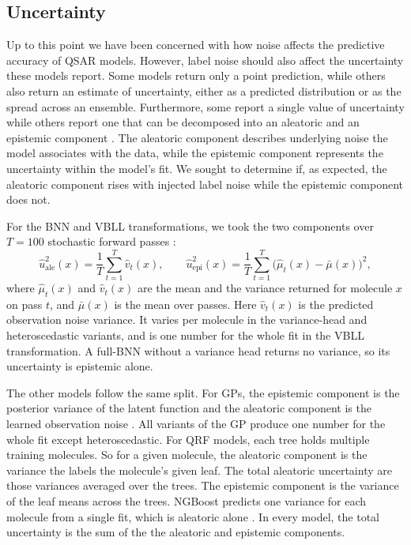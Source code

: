 \subsection{Uncertainty}

Up to this point we have been concerned with how noise affects the predictive accuracy of QSAR models. However, label noise should also affect the uncertainty these models report. Some models return only a point prediction, while others also return an estimate of uncertainty, either as a predicted distribution or as the spread across an ensemble. Furthermore, some report a single value of uncertainty while others report one that can be decomposed into an aleatoric and an epistemic component \citep{kendall2017}. The aleatoric component describes underlying noise the model associates with the data, while the epistemic component represents the uncertainty within the model's fit. We sought to determine if, as expected, the aleatoric component rises with injected label noise while the epistemic component does not.

For the BNN and VBLL transformations, we took the two components over $T = 100$ stochastic forward
passes \citep{kendall2017}:
\begin{equation}
\hat{u}^2_{\text{ale}}(x) = \frac{1}{T}\sum_{t=1}^{T}\hat{v}_t(x),
\qquad
\hat{u}^2_{\text{epi}}(x) = \frac{1}{T}\sum_{t=1}^{T}\big(\hat{\mu}_t(x) - \bar{\mu}(x)\big)^2 ,
\label{eq:sampling_split}
\end{equation}
where $\hat{\mu}_t(x)$ and $\hat{v}_t(x)$ are the mean and the variance returned for molecule $x$ on
pass $t$, and $\bar{\mu}(x)$ is the mean over passes. Here $\hat{v}_t(x)$ is the predicted observation
noise variance. It varies per molecule in the variance-head and heteroscedastic variants, and is one
number for the whole fit in the VBLL transformation. A full-BNN without a variance head returns no
variance, so its uncertainty is epistemic alone.

The other models follow the same split. For GPs, the epistemic component is the posterior variance of the latent function and the aleatoric component is the learned observation noise \citep{Rasmussen2005}. All variants of the GP produce one number for the whole fit except heteroscedastic. For QRF models, each tree holds multiple training molecules. So for a given molecule, the aleatoric component is the variance the labels the molecule's given leaf. The total aleatoric uncertainty are those variances averaged over the trees. The epistemic component is the variance of the leaf means across the trees. NGBoost predicts one variance for each molecule from a single fit, which is aleatoric alone \citep{Duan2020}. In every model, the total uncertainty is the sum of the the aleatoric and epistemic components.

